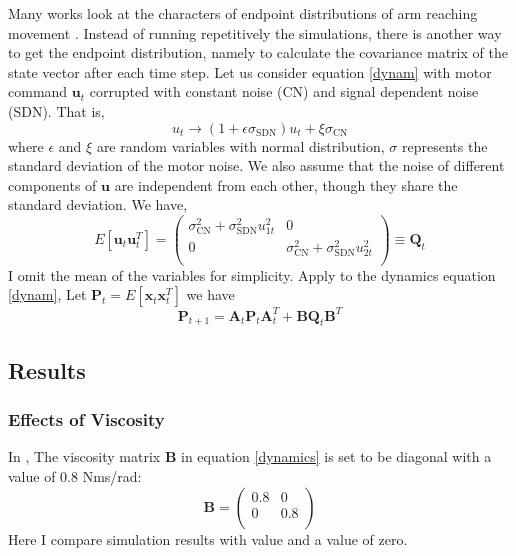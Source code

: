 Many works look at the characters of endpoint distributions of arm reaching movement \cite{VanBeers2004, Guigon2008}. Instead of running repetitively the simulations, there is another way to get the endpoint distribution, namely to calculate the covariance matrix of the state vector after each time step. Let us consider equation \ref{dynam} with motor command $\bm{u}_t$ corrupted with constant noise (CN) and signal dependent noise (SDN). That is,
\begin{equation}
u_t \rightarrow (1 + \epsilon\sigma_{\text{SDN}}) u_t + \xi\sigma_{\text{CN}}
\end{equation}
where $\epsilon$ and $\xi$ are random variables with normal distribution, $\sigma$ represents the standard deviation of the motor noise. We also assume that the noise of different components of $\bm{u}$ are independent from each other, though they share the standard deviation. We have,
\begin{equation}
E[\bm{u}_t\bm{u}_t^T] = 
\left(\begin{matrix}
\sigma_{\text{CN}}^2 + 		\sigma_{\text{SDN}}^2 u_{1t}^2   &  0 \\
0  &   \sigma_{\text{CN}}^2 + 		\sigma_{\text{SDN}}^2 u_{2t}^2   \\
\end{matrix}\right)  \equiv \bm{Q}_t
\end{equation}
I omit the mean of the variables for simplicity. Apply to the dynamics equation \ref{dynam}, Let $\bm{P}_t = E[\bm{x}_{t}\bm{x}_{t}^T]$ we have
\begin{equation}
\bm{P}_{t+1} = \bm{A}_t \bm{P}_t\bm{A}_t^T + \bm{B}\bm{Q}_t\bm{B}^T
\end{equation}

\subsection{Results}\label{results}
\subsubsection{Effects of Viscosity}
In \cite{VanBeers2004}, The viscosity matrix $\bm{B}$ in equation \ref{dynamics} is set to be diagonal with a value of 0.8 Nms/rad:
\begin{equation}
\bm{B} = 
\left(\begin{matrix}
0.8 & 0 \\
0 & 0.8 \\
\end{matrix}\right)
\end{equation}
Here I compare simulation results with \cite{VanBeers2004} value and a value of zero.

